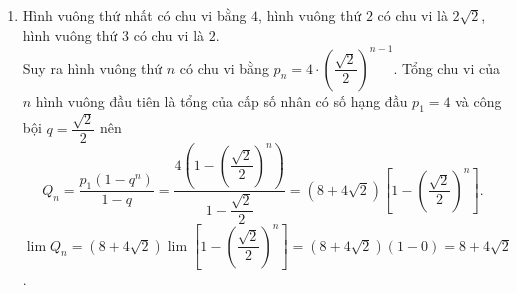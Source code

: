 \begin{bt}
{\begin{enumerate}
			$\lim S_n=\lim 2\left[1-\left(\dfrac{1}{2}\right)^n\right]=2 \left[\lim 1-\lim \left(\dfrac{1}{2}\right)^n\right]=2 $.
			\item Hình vuông thứ nhất có chu vi bằng $4$, hình vuông thứ $2$ có chu vi là $2\sqrt{2}$, hình vuông thứ $3$ có chu vi là $2$.\\
			Suy ra hình vuông thứ $n$ có chu vi bằng $p_n=4\cdot \left(\dfrac{\sqrt{2}}{2}\right)^{n-1}$.
			Tổng chu vi của $n$ hình vuông đầu tiên là tổng của cấp số nhân có  số hạng đầu $p_1=4$ và công bội $q=\dfrac{\sqrt{2}}{2}$ nên 
			\[ Q_n=\dfrac{p_1\left(1-q^n\right)}{1-q}=\dfrac{4\left(1-\left(\dfrac{\sqrt{2}}{2}\right)^n\right)}{1-\dfrac{\sqrt{2}}{2}}=\left(8+4\sqrt{2}\right)\left[1-\left(\dfrac{\sqrt{2}}{2}\right)^n\right].\]
			$\lim Q_n=\left(8+4\sqrt{2}\right)\lim \left[1-\left(\dfrac{\sqrt{2}}{2}\right)^n\right]=\left(8+4\sqrt{2}\right)\left(1-0\right)=8+4\sqrt{2}$.
		\end{enumerate}	
	}
\end{bt}

